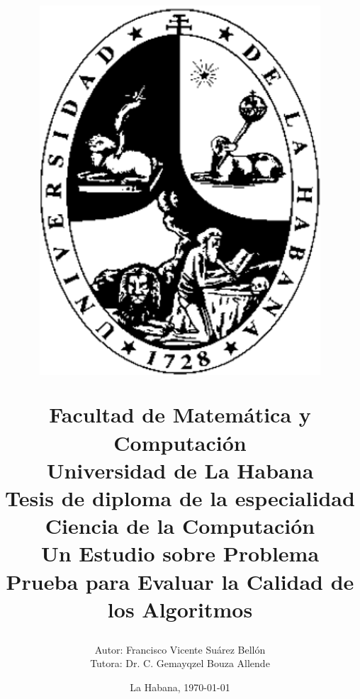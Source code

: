 \begin{titlepage}
	
	\title{\vspace*{-70pt}
		\begin{figure}
			\includegraphics[scale=0.2]{img/logo.png}
		\end{figure} 
		\vspace*{10pt}Facultad de Matemática y Computación \\
		Universidad de La Habana \\
		\vspace*{20pt}	
		Tesis de diploma de la especialidad \\ 
		Ciencia de la Computación \\
		
		\vspace*{20pt}
		Un Estudio sobre
		Problema Prueba para Evaluar la Calidad de los Algoritmos %
		\vspace*{-35pt}
		\author{{\large Autor: Francisco Vicente Suárez Bellón \vspace*{15pt}} \\
			{\large Tutora: Dr. C. Gemayqzel Bouza Allende} \\ \hspace{10pt}  }
		
		\date{La Habana, \today}
	}
	
\end{titlepage}